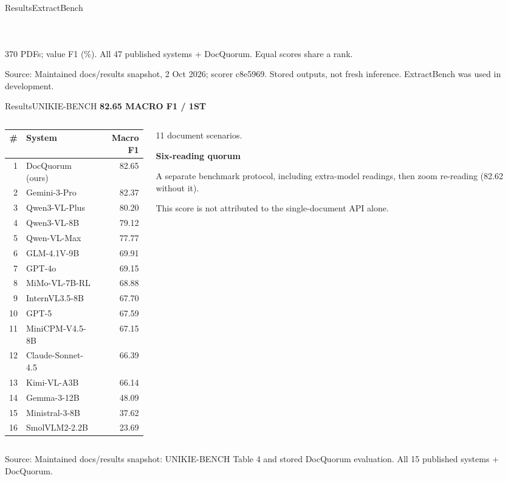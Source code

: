 \documentclass[aspectratio=1610,11pt]{beamer}
\newcommand{\tagline}[1]{{\scriptsize\color{teal}\bfseries #1}\par\vspace{1mm}}
\newcommand{\source}[1]{\vfill{\fontsize{5.7}{6.8}\selectfont\color{muted}Source: #1\par}}
\newcommand{\lbl}[1]{{\color{teal}\bfseries #1}\par}
\begin{document}
\begin{frame}{Results\quad ExtractBench}
{\begin{columns}[T]
\begin{column}{.495\linewidth}
\begin{tabularx}{\linewidth}{@{}rXrrrr@{}}
\bottomrule\end{tabularx}
\end{column}
\end{columns}}
\vspace{1mm}\scriptsize 370 PDFs; value F1 (\%). All 47 published systems + DocQuorum. Equal scores share a rank.
\source{Maintained docs/results snapshot, 2 Oct 2026; scorer c8e5969. Stored outputs, not fresh inference. ExtractBench was used in development.}
\end{frame}

\begin{frame}{Results\quad UNIKIE-BENCH}
\tagline{82.65 MACRO F1 / 1ST}
\begin{columns}[T]
\begin{column}{.60\linewidth}
{\scriptsize\renewcommand{\arraystretch}{1.03}
\begin{tabularx}{\linewidth}{@{}rXr@{}}\toprule
\# & System & Macro F1\\\midrule
\rowcolor{mint} 1 & DocQuorum (ours) & 82.65 \\
2 & Gemini-3-Pro & 82.37 \\
3 & Qwen3-VL-Plus & 80.20 \\
4 & Qwen3-VL-8B & 79.12 \\
5 & Qwen-VL-Max & 77.77 \\
6 & GLM-4.1V-9B & 69.91 \\
7 & GPT-4o & 69.15 \\
8 & MiMo-VL-7B-RL & 68.88 \\
9 & InternVL3.5-8B & 67.70 \\
10 & GPT-5 & 67.59 \\
11 & MiniCPM-V4.5-8B & 67.15 \\
12 & Claude-Sonnet-4.5 & 66.39 \\
13 & Kimi-VL-A3B & 66.14 \\
14 & Gemma-3-12B & 48.09 \\
15 & Ministral-3-8B & 37.62 \\
16 & SmolVLM2-2.2B & 23.69 \\

\bottomrule\end{tabularx}}
\end{column}
\begin{column}{.34\linewidth}
\vspace{4mm}\lbl{4,472 images}
11 document scenarios.\par\vspace{2mm}
\lbl{Six-reading quorum}
A separate benchmark protocol, including extra-model readings, then zoom re-reading (82.62 without it).\par\vspace{2mm}
\small This score is not attributed to the single-document API alone.
\end{column}
\end{columns}
\source{Maintained docs/results snapshot: UNIKIE-BENCH Table 4 and stored DocQuorum evaluation. All 15 published systems + DocQuorum.}
\end{frame}
\end{document}
